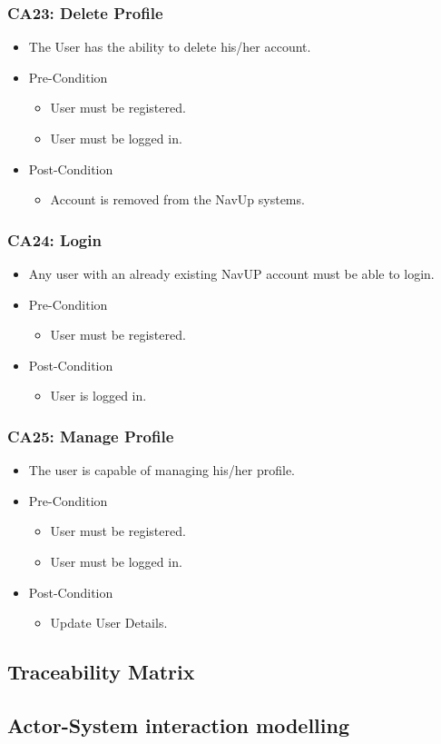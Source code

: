\documentclass[12pt,a4paper]{article}
\begin{document}
		\subsubsection{CA23: Delete Profile}
			\begin{itemize}
				\item The User has the ability to delete his/her account.
					\item Pre-Condition
						\begin{itemize}
							\item User must be registered.
							\item User must be logged in.
						\end{itemize}
					\item Post-Condition
						\begin{itemize}
							\item Account is removed from the NavUp systems.
						\end{itemize}
			\end{itemize}
		\subsubsection{CA24: Login}
			\begin{itemize}
				\item Any user with an already existing NavUP account must be able to login.
					\item Pre-Condition
						\begin{itemize}
							\item User must be registered.
						\end{itemize}
					\item Post-Condition
						\begin{itemize}
							\item User is logged in.
						\end{itemize}
			\end{itemize}
		\subsubsection{CA25: Manage Profile}
			\begin{itemize}
				\item The user is capable of managing his/her profile.
					\item Pre-Condition
						\begin{itemize}
							\item User must be registered.
							\item User must be logged in.
						\end{itemize}
					\item Post-Condition
						\begin{itemize}
							\item Update User Details.
						\end{itemize}
			\end{itemize}
	\subsection{Traceability Matrix}
	\subsection{Actor-System interaction modelling}
\end{document}
